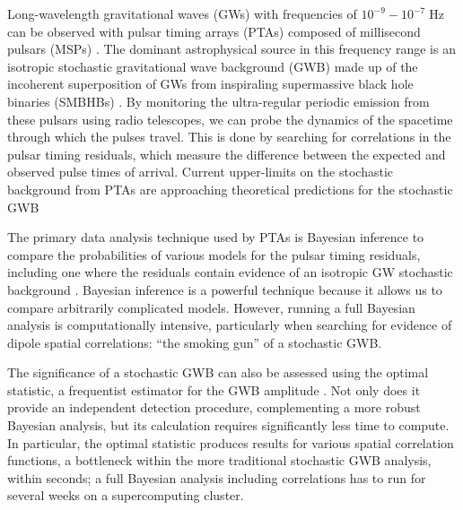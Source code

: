 \documentclass[twocolumn,aps,prd,superscriptaddress]{revtex4-1}
\begin{document}
Long-wavelength gravitational waves (GWs) with frequencies of 
$10^{-9} - 10^{-7} \; \mathrm{Hz}$ can be observed with pulsar timing arrays (PTAs) 
composed of millisecond pulsars (MSPs) \cite{hd1983,fb1990}. 
The dominant astrophysical source in this frequency range is an isotropic stochastic 
gravitational wave background (GWB) 
made up of the incoherent superposition of GWs from inspiraling 
supermassive black hole binaries (SMBHBs) 
\citep{1995ApJ...446..543R, 2003ApJ...583..616J, 2003ApJ...590..691W}. 
By monitoring the ultra-regular periodic emission from these pulsars using radio telescopes, 
we can probe the dynamics of the spacetime through which the pulses travel. 
This is done by searching for correlations in the pulsar timing residuals, 
which measure the difference between the expected and observed pulse times of arrival. 
Current upper-limits on the stochastic background from PTAs are approaching 
theoretical predictions for the stochastic GWB \citep{PPTA2013,EPTA2015,NANOGrav9yr}

The primary data analysis technique used by PTAs is Bayesian inference 
to compare the probabilities of various models for the pulsar timing residuals, 
including one where the residuals contain evidence of an isotropic GW stochastic background 
\citep{vlm+2009,lah+2013}. 
Bayesian inference is a powerful technique because it allows us to compare arbitrarily complicated models. 
However, running a full Bayesian analysis is computationally intensive, 
particularly when searching for evidence of dipole spatial correlations:
``the smoking gun'' of a stochastic GWB.

The significance of a stochastic GWB can also be assessed using the 
optimal statistic, a frequentist estimator for the GWB amplitude \citep{abc+2009,demorest+2013,ccs+2015}. 
Not only does it provide an independent detection procedure, complementing a more robust Bayesian analysis, but its calculation requires significantly less time to compute. In particular, the optimal statistic produces results for various spatial correlation functions, a bottleneck within the more traditional stochastic GWB analysis, within seconds; a full Bayesian analysis including correlations has to run for several weeks on a supercomputing cluster. 
\end{document}
